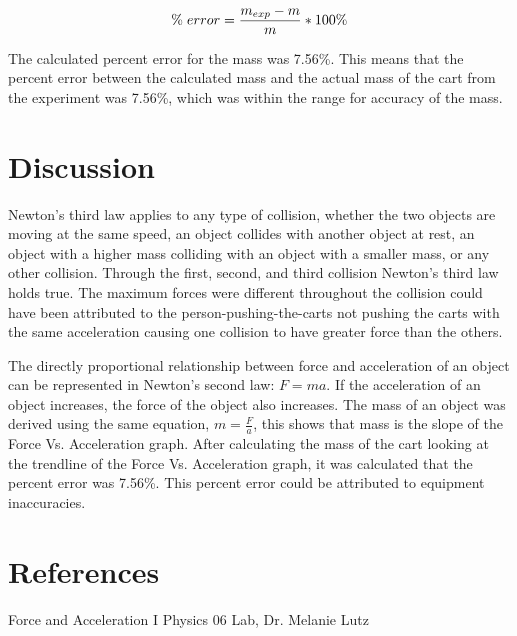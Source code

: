 \documentclass[aps,letterpaper,11pt]{revtex4}
\begin{document}
$$ \% \hspace{1mm}error = \frac{m_{exp}-m}{m}*100\%$$ 

The calculated percent error for the mass was 7.56\%. This means that the percent error between the calculated mass and the actual mass of the cart from the experiment was 7.56\%, which was within the range for accuracy of the mass.

\section{Discussion} 

Newton's third law applies to any type of collision, whether the two objects are moving at the same speed, an object collides with another object at rest, an object with a higher mass colliding with an object with a smaller mass, or any other collision. Through the first, second, and third collision Newton's third law holds true. The maximum forces were different throughout the collision could have been attributed to the person-pushing-the-carts not pushing the carts with the same acceleration causing one collision to have greater force than the others. 

The directly proportional relationship between force and acceleration of an object can be represented in Newton's second law: $F = ma$. If the acceleration of an object increases, the force of the object also increases. The mass of an object was derived using the same equation, $m = \frac{F}{a}$, this shows that mass is the slope of the Force Vs. Acceleration graph. After calculating the mass of the cart looking at the trendline of the Force Vs. Acceleration graph, it was calculated that the percent error was 7.56\%. This percent error could be attributed to equipment inaccuracies.   

\section{References}

\hspace{-6.5mm}
Force and Acceleration I Physics 06 Lab, Dr. Melanie Lutz\\
\end{document}
